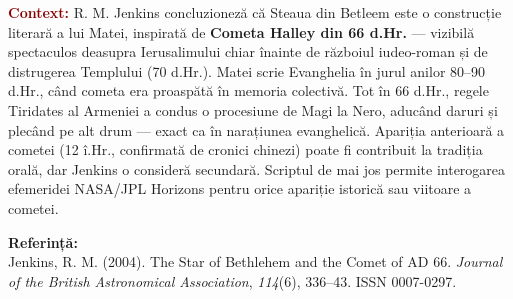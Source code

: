 \documentclass[12pt,a4paper,twoside,openany]{book}
\begin{document}
\begin{infobox}

\textcolor{darkred}{\textbf{Context:}} R. M. Jenkins concluzioneză că Steaua din Betleem este o construcție literară a lui Matei, inspirată de \textbf{Cometa Halley din 66 d.Hr.} — vizibilă spectaculos deasupra Ierusalimului chiar înainte de războiul iudeo-roman și de distrugerea Templului (70 d.Hr.). Matei scrie Evanghelia în jurul anilor 80–90 d.Hr., când cometa era proaspătă în memoria colectivă. Tot în 66 d.Hr., regele Tiridates al Armeniei a condus o procesiune de Magi la Nero, aducând daruri și plecând pe alt drum — exact ca în narațiunea evanghelică. Apariția anterioară a cometei (12 î.Hr., confirmată de cronici chinezi) poate fi contribuit la tradiția orală, dar Jenkins o consideră secundară. Scriptul de mai jos permite interogarea efemeridei NASA/JPL Horizons pentru orice apariție istorică sau viitoare a cometei.

\end{infobox}

\begin{infobox}

\textbf{Referință:} \\

Jenkins, R. M. (2004). The Star of Bethlehem and the Comet of AD 66. \textit{Journal of the British Astronomical Association}, \textit{114}(6), 336–43. ISSN 0007-0297.

\end{infobox}
\end{document}

